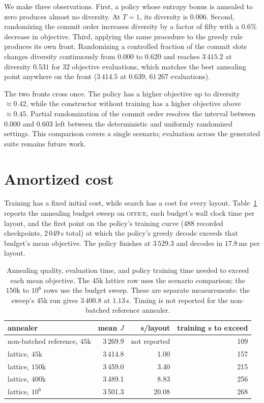 \documentclass[11pt]{article}
\begin{document}
We make three observations. First, a policy whose entropy bonus is annealed to
zero produces almost no diversity. At $T{=}1$, its diversity is $0.006$. Second,
randomizing the commit order increases diversity by a factor of fifty with a
$0.6\%$ decrease in objective. Third, applying the same procedure to the greedy
rule produces its own front. Randomizing a controlled fraction of the commit
slots changes diversity continuously from $0.000$ to $0.620$ and reaches $3\,415.2$ at
diversity $0.531$ for $32$ objective evaluations, which matches the best
annealing point anywhere on the front ($3\,414.5$ at $0.639$, $61\,267$
evaluations).

The two fronts cross once. The policy has a higher objective up to diversity
$\approx0.42$, while the constructor without training has a higher objective above
$\approx0.45$. Partial randomization of the commit order resolves the interval between
$0.000$ and $0.603$ left between the deterministic and uniformly randomized settings.
This comparison covers a single scenario; evaluation across the generated
suite remains future work.

\section{Amortized cost}
\label{app:amortize}
Training has a fixed initial cost, while search has a cost for every layout.
Table~\ref{tab:amortize} reports the annealing budget sweep on
\textsc{office}, each budget's
wall clock time per layout, and the first point on the policy's training curve
($488$ recorded checkpoints, $2\,049$\,s total) at which the policy's greedy
decode exceeds that budget's mean objective. The policy finishes at $3\,529.3$
and decodes in $17.8$\,ms per layout.

\begin{table}[htbp]
\centering
\caption{Annealing quality, evaluation time, and policy training time needed
to exceed each mean objective. The $45$k lattice row uses the scenario
comparison; the $150$k to $10^6$ rows use the budget sweep. These are separate
measurements: the sweep's $45$k run gives $3\,400.8$ at $1.13$\,s. Timing is
not reported for the non-batched reference annealer.}
\label{tab:amortize}
\footnotesize
\begin{tabular}{@{}lrrr@{}}
\toprule
annealer & mean $J$ & s/layout & training s to exceed \\
\midrule
non-batched reference, $45$k & 3\,269.9 & not reported & 109 \\
lattice, $45$k   & 3\,414.8 & 1.00 & 157 \\
lattice, $150$k  & 3\,459.0 & 3.40 & 215 \\
lattice, $400$k  & 3\,489.1 & 8.83 & 256 \\
lattice, $10^{6}$ & 3\,501.3 & 20.08 & 268 \\
\bottomrule
\end{tabular}
\end{table}
\end{document}
